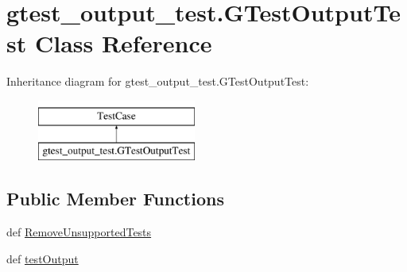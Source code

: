 \hypertarget{classgtest__output__test_1_1_g_test_output_test}{\section{gtest\-\_\-output\-\_\-test.\-G\-Test\-Output\-Test Class Reference}
\label{classgtest__output__test_1_1_g_test_output_test}
}
Inheritance diagram for gtest\-\_\-output\-\_\-test.\-G\-Test\-Output\-Test\-:\begin{figure}[H]
\begin{center}
\leavevmode
\includegraphics[height=2.000000cm]{classgtest__output__test_1_1_g_test_output_test}
\end{center}
\end{figure}
\subsection*{Public Member Functions}
\begin{DoxyCompactItemize}
\item 
def \hyperlink{classgtest__output__test_1_1_g_test_output_test_a5fd20de9ce41d36e690aba1e0934ad5a}{Remove\-Unsupported\-Tests}
\item 
def \hyperlink{classgtest__output__test_1_1_g_test_output_test_a7f72190540ce9900c6547e92a88077c1}{test\-Output}
\end{DoxyCompactItemize}


